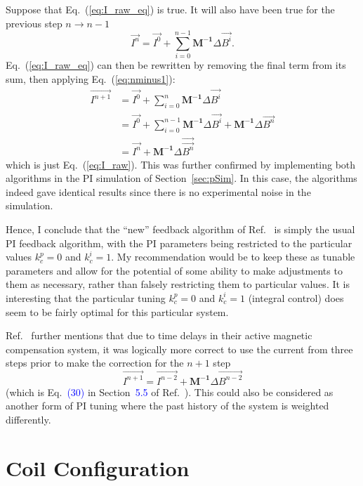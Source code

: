 Suppose that Eq.~(\ref{eq:I_raw_eq}) is true.  It will also have been
true for the previous step $n\rightarrow n-1$
\begin{equation}\label{eq:nminus1}
    \vec{I^n}= \vec{I^0}+\sum_{i=0}^{n-1} \bm{M^{-1}}\Delta \vec{B^i}.
\end{equation}
Eq.~(\ref{eq:I_raw_eq}) can then be rewritten by removing the final
term from its sum, then applying Eq.~(\ref{eq:nminus1}):
\begin{equation}
\begin{split}
\vec{I^{n+1}}&=\vec{I^0}+\sum_{i=0}^n \bm{M^{-1}}\Delta \vec{B^i}\\
&=\vec{I^0}+\sum_{i=0}^{n-1}\bm{M^{-1}}\Delta \vec{B^i}+ \bm{M^{-1}}\Delta \vec{B^n}\\
&=\vec{I^n}+ \bm{M^{-1}}\Delta \vec{\vec{B^n}}
\end{split}
\end{equation}
which is just Eq.~(\ref{eq:I_raw}).  This was further confirmed by
implementing both algorithms in the PI simulation of
Section~\ref{sec:pSim}.  In this case, the algorithms indeed gave
identical results since there is no experimental noise in the
simulation.

Hence, I conclude that the ``new'' feedback algorithm of
Ref.~\cite{rawlik} is simply the usual PI feedback algorithm, with the
PI parameters being restricted to the particular values $k_c^p=0$ and
$k_c^i=1$. My recommendation would be to keep these as tunable
parameters and allow for the potential of some ability to make
adjustments to them as necessary, rather than falsely restricting them
to particular values. It is interesting that the particular tuning
$k_c^p=0$ and $k_c^i=1$ (integral control) does seem to be fairly optimal
for this particular system.

Ref.~\cite{rawlik} further mentions that due to time delays in their
active magnetic compensation system, it was logically more correct to
use the current from three steps prior to make the correction for the
$n+1$ step
\begin{equation}\label{eq:I_raw_delay}
    \vec{I^{n+1}}= \vec{I^{n-2}}+\bm{M^{-1}} \Delta \vec{B^{n-2}}
\end{equation}
(which is Eq.~\textcolor{blue}{(30)} in Section~\textcolor{blue}{5.5} of
Ref.~\cite{rawlik}).  This could also be
considered as another form of PI tuning where the past history of the
system is weighted differently.


\section{Coil Configuration}\label{sec:coil_config}


